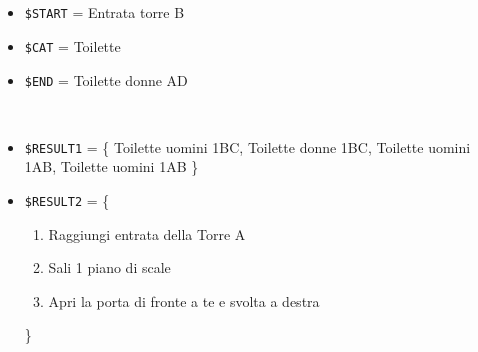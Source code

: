 \documentclass[../../SperimentazioniPratiche.tex]{subfiles}
\begin{document}
			\paragraph*{}
			\label{Prova1B.2}
			\begin{tcolorbox}[fonttitle=\bfseries, 
								adjusted title={\Large Prova 1B.2}, 
								breakable, 
								sharp corners=south,
								colback=white, 
								colframe=white!60!black]
								
				\begin{description}[leftmargin=0.7cm,labelwidth=!]
				
					\item[Input] \ \par 
        				\begin{itemize}
        					\item \verb|$START| = Entrata torre B
							\item \verb|$CAT| = Toilette
							\item \verb|$END| = Toilette donne AD
        				\end{itemize}
        				
        			\tcbline 
        				
        			\item[Output atteso] \ \par
        				\begin{itemize}

							\item \verb|$RESULT1| = \{
								Toilette uomini 1BC, Toilette donne 1BC, Toilette uomini 1AB, Toilette uomini 1AB
							\}        				
        				
        					\item \verb|$RESULT2| = \{
        					\begin{enumerate}
        						\item Raggiungi entrata della Torre A
								\item Sali 1 piano di scale
								\item Apri la porta di fronte a te e svolta a destra
        					\end{enumerate}
        					\}
        				\end{itemize}

					\tcbline        				
        				
        			\item[Output riscontrato] \ \par
        				\begin{description}
        				

\end{description}
\end{description}
\end{tcolorbox}
\end{document}
